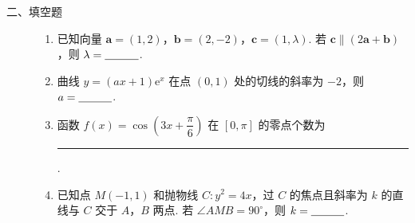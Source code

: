 \begin{description}

    \item[二、填空题]

    \begin{enumerate}[leftmargin=5pt]

      \addtocounter{enumi}{+12}

        \item 已知向量 \(\bm{a}=(1,2)\)，\(\bm{b}=(2,-2)\)，\(\bm{c}=(1,\lambda)\). 若 \(\bm{c}\parallel (2\bm{a}+\bm{b})\)，则 \(\lambda=\rule[-0.3ex]{3em}{0.4pt}\).

        \item 曲线 \(y=(ax+1){\mathrm{e}}^x\) 在点 \((0,1)\) 处的切线的斜率为 \(-2\)，则 \(a=\rule[-0.3ex]{3em}{0.4pt}\).

        \item 函数 \(f(x)=\cos\!\left(3x+\dfrac{\pi}{6}\right)\) 在 \([0,\pi]\) 的零点个数为\rule[-0.3ex]{3em}{0.4pt}.

        \item 已知点 \(M(-1,1)\) 和抛物线 \(C:y^2=4x\)，过 \(C\) 的焦点且斜率为 \(k\) 的直线与 \(C\) 交于 \(A\)，\(B\) 两点. 若 \(\angle AMB=90^\circ\)，则 \(k=\rule[-0.3ex]{3em}{0.4pt}\).

    \end{enumerate}

\end{description}

